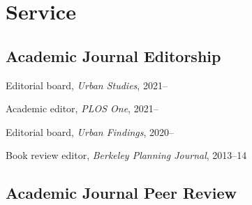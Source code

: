 \documentclass[11pt,letterpaper]{report}
\newcommand{\listitemspace}{0.25em}
\renewenvironment{itemize}
{\begin{list}{}{\setlength{\leftmargin}{0em}
                \setlength{\parskip}{0em}
                \setlength{\itemsep}{\listitemspace}
                \setlength{\parsep}{\listitemspace}}}
{\end{list}}
\begin{document}
    \section*{Service}

    \subsection*{Academic Journal Editorship}

    \begin{itemize}

        \item Editorial board, \textit{Urban Studies}, 2021--
        \item Academic editor, \textit{PLOS One}, 2021--
        \item Editorial board, \textit{Urban Findings}, 2020--
        \item Book review editor, \textit{Berkeley Planning Journal}, 2013--14

    \end{itemize}

    \subsection*{Academic Journal Peer Review}
\end{document}
